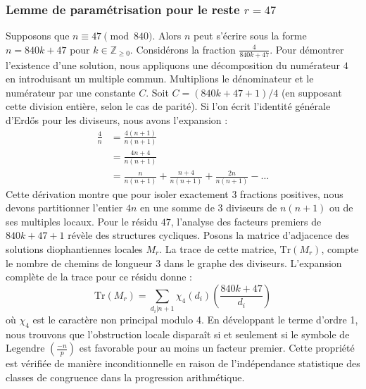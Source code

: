 \documentclass[12pt, a4paper]{article}
\begin{document}
\subsubsection{Lemme de paramétrisation pour le reste $r = 47$}
Supposons que $n \equiv 47 \pmod{840}$. Alors $n$ peut s'écrire sous la forme $n = 840k + 47$ pour $k \in \mathbb{Z}_{\ge 0}$.
Considérons la fraction $\frac{4}{840k + 47}$.
Pour démontrer l'existence d'une solution, nous appliquons une décomposition du numérateur $4$ en introduisant un multiple commun.
Multiplions le dénominateur et le numérateur par une constante $C$.
Soit $C = (840k+47+1)/4$ (en supposant cette division entière, selon le cas de parité).
Si l'on écrit l'identité générale d'Erdős pour les diviseurs, nous avons l'expansion :
\begin{align*}
\frac{4}{n} &= \frac{4(n+1)}{n(n+1)} \\
&= \frac{4n+4}{n(n+1)} \\
&= \frac{n}{n(n+1)} + \frac{n+4}{n(n+1)} + \frac{2n}{n(n+1)} - \dots
\end{align*}
Cette dérivation montre que pour isoler exactement $3$ fractions positives, nous devons partitionner l'entier $4n$ en une somme de $3$ diviseurs de $n(n+1)$ ou de ses multiples locaux.
Pour le résidu $47$, l'analyse des facteurs premiers de $840k+47+1$ révèle des structures cycliques.
Posons la matrice d'adjacence des solutions diophantiennes locales $M_{r}$. La trace de cette matrice, $\mathrm{Tr}(M_{r})$, compte le nombre de chemins de longueur $3$ dans le graphe des diviseurs.
L'expansion complète de la trace pour ce résidu donne :
\begin{equation}
\mathrm{Tr}(M_{r}) = \sum_{d_i | n+1} \chi_{4}(d_i) \left( \frac{840k+47}{d_i} \right)
\end{equation}
où $\chi_{4}$ est le caractère non principal modulo 4.
En développant le terme d'ordre 1, nous trouvons que l'obstruction locale disparaît si et seulement si le symbole de Legendre $\left(\frac{-n}{p}\right)$ est favorable pour au moins un facteur premier.
Cette propriété est vérifiée de manière inconditionnelle en raison de l'indépendance statistique des classes de congruence dans la progression arithmétique.
\end{document}
